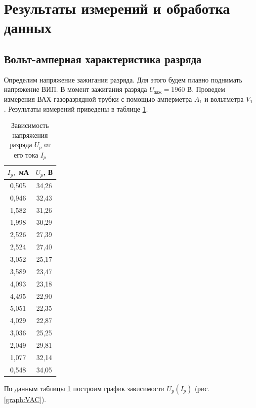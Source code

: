 \documentclass[a4paper, 12pt]{article}
\begin{document}
    \newpage
	
    \section{Результаты измерений и обработка данных}

    \subsection{Вольт-амперная характеристика разряда}

     Определим напряжение зажигания разряда. Для этого будем плавно поднимать напряжение ВИП. В момент зажигания разряда $U_\text{заж} = 1960$ В. Проведем измерения ВАХ газоразрядной трубки с помощью амперметра $A_1$ и вольтметра $V_1$. Результаты измерений приведены в таблице \ref{table:VAC}.

     \begin{table}[H]
        \centering
        \begin{tabular}{|c|c|}
        \hline
        $I_p,$ мА & $U_p$, В \\ \hline
        0,505 & 34,26 \\ \hline
        0,946 & 32,43 \\ \hline
        1,582 & 31,26 \\ \hline
        1,998 & 30,29 \\ \hline
        2,526 & 27,39 \\ \hline
        2,524 & 27,40 \\ \hline
        3,052 & 25,17 \\ \hline
        3,589 & 23,47 \\ \hline
        4,093 & 23,18 \\ \hline
        4,495 & 22,90 \\ \hline
        5,051 & 22,35 \\ \hline
        4,029 & 22,87 \\ \hline
        3,036 & 25,25 \\ \hline
        2,049 & 29,81 \\ \hline
        1,077 & 32,14 \\ \hline
        0,548 & 34,05 \\ \hline
        \end{tabular}
        \caption{Зависимость напряжения разряда $U_p$ от его тока $I_p$}
        \label{table:VAC}
    \end{table}
             
     По данным таблицы \ref{table:VAC} построим график зависимости $U_p(I_p)$ (рис. \ref{graph:VAC}). 
     
\end{document}
